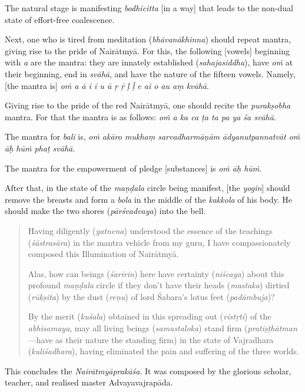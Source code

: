 \documentclass[naipra.tex]{subfiles}
\begin{document}
The natural stage is manifesting \emph{bodhicitta} [in a way] that leads to the non-dual state of effort-free coalescence.

Next, one who is tired from meditation (\emph{bhāvanākhinna}) should repeat mantra, giving rise to the pride of Nairātmyā.
For this, the following [vowels] beginning with \emph{a} are the mantra: they are innately established (\emph{sahajasiddha}), have \emph{oṁ} at their beginning, end in \emph{svāhā}, and have the nature of the fifteen vowels.
Namely, [the mantra is] \emph{oṁ a ā i ī u ū ṛ ṝ ḷ ḹ e ai o au aṃ kvāhā}.

Giving rise to the pride of the red Nairātmyā, one should recite the \emph{purakṣobha} mantra.
For that the mantra is as follows: \emph{oṁ a ka ca ṭa ta pa ya śa svāhā}.

The mantra for \emph{bali} is, \emph{oṁ akāro mukhaṃ sarvadharmāṇām ādyanutpannatvāt oṁ āḥ hūṁ phaṭ svāhā}.

The mantra for the empowerment of pledge [substances] is \emph{oṁ āḥ hūṁ}.

After that, in the state of the \emph{maṇḍala} circle being manifest, [the \emph{yogin}] should remove the breasts and form a \emph{bola} in the middle of the \emph{kakkola} of his body.
He should make the two shores (\emph{pārśvadvaya}) into the bell.

\begin{quote}
	Having diligently (\emph{yatnena}) understood the essence of the teachings (\emph{śāstrasāra}) in the mantra vehicle from my guru, I have compassionately composed this Illumination of Nairātmyā.

	Alas, how can beings (\emph{śarīrin}) here have certainty (\emph{niścaya}) about this profound \emph{maṇḍala} circle if they don't have their heads (\emph{mastaka}) dirtied (\emph{rūkṣita}) by the dust (\emph{reṇu}) of lord Śabara's lotus feet (\emph{padāmbuja})?

	By the merit (\emph{kuśala}) obtained in this spreading out (\emph{vistṛti}) of the \emph{abhisamaya}, may all living beings (\emph{samastaloka}) stand firm (\emph{pratiṣṭhātman}—have as their nature the standing firm) in the state of Vajradhara (\emph{kuliśadhara}), having eliminated the pain and suffering of the three worlds. 
\end{quote}

This concludes the \emph{Nairātmyāprakāśa}.
It was composed by the glorious scholar, teacher, and realised master Advayavajrapāda. 
\end{document}
